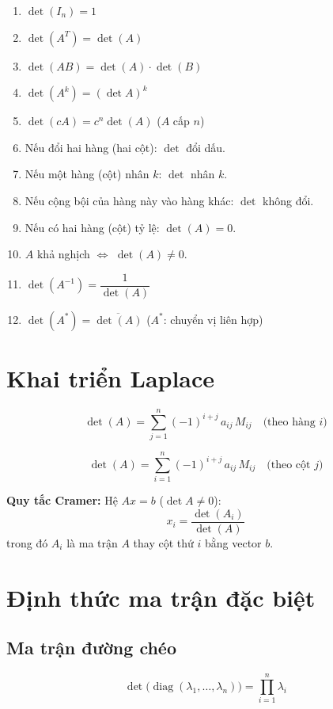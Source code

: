 \begin{enumerate}
    \item $\det(I_n) = 1$
    \item $\det(A^T) = \det(A)$
    \item $\det(AB) = \det(A) \cdot \det(B)$
    \item $\det(A^k) = (\det A)^k$
    \item $\det(cA) = c^n \det(A)$ \quad ($A$ cấp $n$)
    \item Nếu đổi hai hàng (hai cột): $\det$ đổi dấu.
    \item Nếu một hàng (cột) nhân $k$: $\det$ nhân $k$.
    \item Nếu cộng bội của hàng này vào hàng khác: $\det$ không đổi.
    \item Nếu có hai hàng (cột) tỷ lệ: $\det(A) = 0$.
    \item $A$ khả nghịch $\Longleftrightarrow$ $\det(A) \neq 0$.
    \item $\det(A^{-1}) = \dfrac{1}{\det(A)}$
    \item $\det(A^*) = \overline{\det(A)}$ \quad ($A^*$: chuyển vị liên hợp)
\end{enumerate}

\section{Khai triển Laplace}

\[
\det(A) = \sum_{j=1}^{n} (-1)^{i+j} \, a_{ij} \, M_{ij}
\quad \text{(theo hàng } i\text{)}
\]

\[
\det(A) = \sum_{i=1}^{n} (-1)^{i+j} \, a_{ij} \, M_{ij}
\quad \text{(theo cột } j\text{)}
\]

\textbf{Quy tắc Cramer:} Hệ $Ax = b$ ($\det A \neq 0$):
\[
x_i = \frac{\det(A_i)}{\det(A)}
\]
trong đó $A_i$ là ma trận $A$ thay cột thứ $i$ bằng vector $b$.

\section{Định thức ma trận đặc biệt}

\subsection{Ma trận đường chéo}
\[
\det\bigl(\operatorname{diag}(\lambda_1,\dots,\lambda_n)\bigr) = \prod_{i=1}^n \lambda_i
\]

